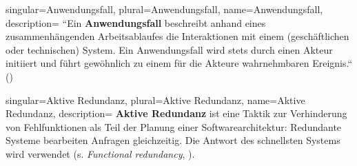 {
singular={Anwendungsfall},
plural={Anwendungsfall},
name={Anwendungsfall},
description={
``Ein \textbf{Anwendungsfall} beschreibt anhand eines zusammenhängenden Arbeitsablaufes die Interaktionen mit einem (geschäftlichen oder technischen) System. Ein Anwendungsfall wird stets durch einen Akteur initiiert und führt gewöhnlich zu einem für die Akteure wahrnehmbaren Ereignis.`` (\cite[351]{Oes05})
}
}

{
singular={Aktive Redundanz},
plural={Aktive Redundanz},
name={Aktive Redundanz},
description={
\textbf{Aktive Redundanz} ist eine Taktik zur Verhinderung von Fehlfunktionen als Teil der Planung einer Softwarearchitektur: Redundante Systeme bearbeiten Anfragen gleichzeitig. Die Antwort des schnellsten Systems wird verwendet (s. \textit{Functional redundancy}, \cite[90]{BCK12}).
}
}
